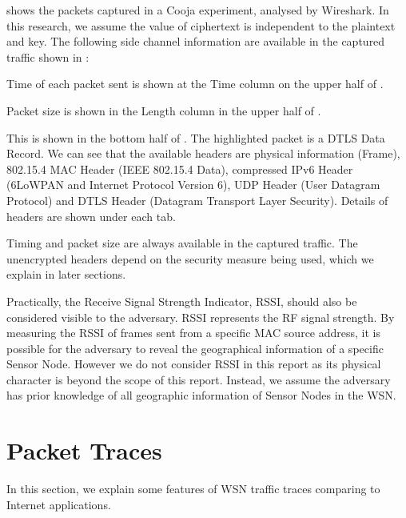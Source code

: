  shows the packets captured in a Cooja experiment, analysed by Wireshark\cite{Wireshark}. In this research, we assume the value of ciphertext is independent to the plaintext and key. The following side channel information are available in the captured traffic shown in :

\begin{description}[style=nextline]
	\item[Timing]
	Time of each packet sent is shown at the Time column on the upper half of .
	\item[Packet Size]
	Packet size is shown in the Length column in the upper half of .
	\item[Unencrypted headers]
	This is shown in the bottom half of . The highlighted packet is a DTLS Data Record. We can see that the available headers are physical information (Frame), 802.15.4 MAC Header (IEEE 802.15.4 Data), compressed IPv6 Header (6LoWPAN and Internet Protocol Version 6), UDP Header (User Datagram Protocol) and DTLS Header (Datagram Transport Layer Security). Details of headers are shown under each tab.
\end{description}

Timing and packet size are always available in the captured traffic. The unencrypted headers depend on the security measure being used, which we explain in later sections.

Practically, the Receive Signal Strength Indicator, RSSI, should also be considered visible to the adversary. RSSI represents the RF signal strength. By measuring the RSSI of frames sent from a specific MAC source address,  it is possible for the adversary to reveal the geographical information of a specific Sensor Node. However we do not consider RSSI in this report as its physical character is beyond the scope of this report. Instead, we assume the adversary has prior knowledge of all geographic information of Sensor Nodes in the WSN.

\section{Packet Traces} \label{Sec: Packet Traces}

In this section, we explain some features of WSN traffic traces comparing to Internet applications.

